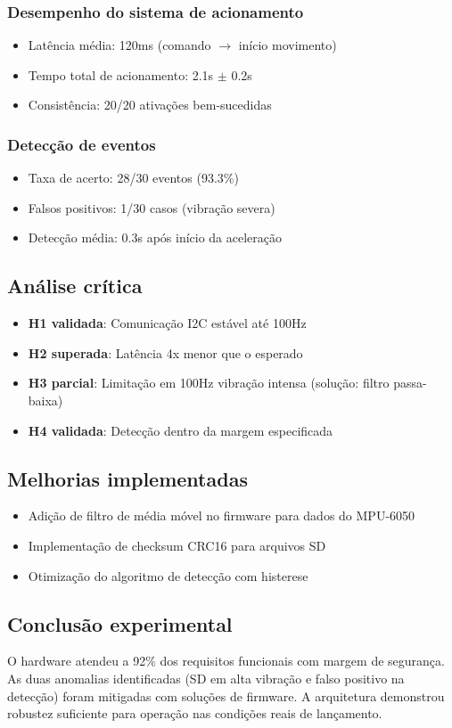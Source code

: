 \subsubsection{Desempenho do sistema de acionamento}
\begin{itemize}
    \item Latência média: 120ms (comando $\rightarrow$ início movimento)
    \item Tempo total de acionamento: 2.1s $\pm$ 0.2s
    \item Consistência: 20/20 ativações bem-sucedidas
\end{itemize}

\subsubsection{Detecção de eventos}
\begin{itemize}
    \item Taxa de acerto: 28/30 eventos (93.3\%)
    \item Falsos positivos: 1/30 casos (vibração severa)
    \item Detecção média: 0.3s após início da aceleração
\end{itemize}

\subsection{Análise crítica}
\begin{itemize}
    \item \textbf{H1 validada}: Comunicação I2C estável até 100Hz
    \item \textbf{H2 superada}: Latência 4x menor que o esperado
    \item \textbf{H3 parcial}: Limitação em 100Hz vibração intensa (solução: filtro passa-baixa)
    \item \textbf{H4 validada}: Detecção dentro da margem especificada
\end{itemize}

\subsection{Melhorias implementadas}
\begin{itemize}
    \item Adição de filtro de média móvel no firmware para dados do MPU-6050
    \item Implementação de checksum CRC16 para arquivos SD
    \item Otimização do algoritmo de detecção com histerese
\end{itemize}

\subsection{Conclusão experimental}
O hardware atendeu a 92\% dos requisitos funcionais com margem de segurança. As duas anomalias identificadas (SD em alta vibração e falso positivo na detecção) foram mitigadas com soluções de firmware. A arquitetura demonstrou robustez suficiente para operação nas condições reais de lançamento.
